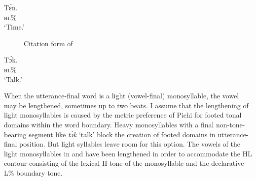 \ea\label{ex:key:43}
\gll Tɛ́n.\\
\textsc{hl\%}\\
\glt  ‘Time.’
\z

\begin{figure}
	\caption{Citation form of }
	\label{fig:key:3.2}
\end{figure}

\ea\label{ex:key:44}
\gll Tɔ́k.\\
\textsc{hl\%}\\
\glt ‘Talk.’
\z

\largerpage
When the utterance-final word is a light (vowel-final) monosyllable, the vowel may be lengthened, sometimes up to two beats. I assume that the lengthening of light monosyllables is caused by the metric preference of Pichi for footed tonal domains within the word boundary. Heavy monosyllables with a final non-tone-bearing segment like \textit{tɔ́k} ‘talk’ block the creation of footed domains in utterance-final position. But light syllables leave room for this option. The vowels of the light monosyllables in  and  have been lengthened in order to accommodate the HL contour consisting of the lexical H tone of the monosyllable and the declarative L\% boundary tone. 

\largerpage[2]

